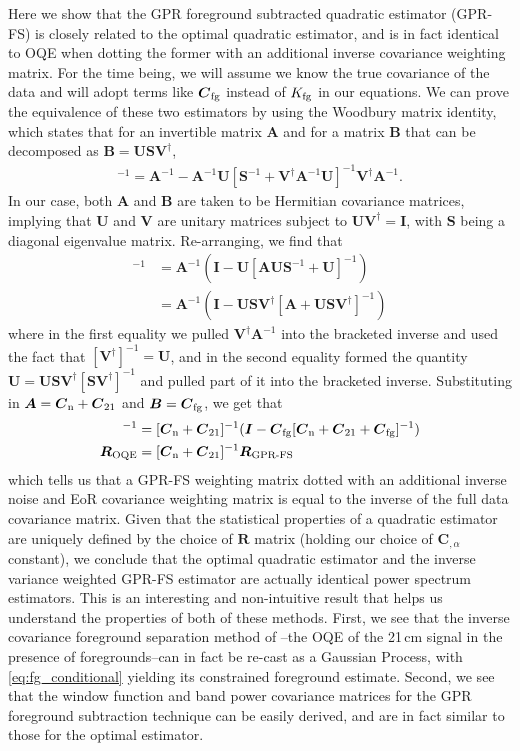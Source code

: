 \documentclass[a4paper,fleqn,usenatbib]{mnras}
\def\R{\boldsymbol{R}}
\def\C{\boldsymbol{C}}
\def\V{\boldsymbol{V}}
\def\Cfg{\boldsymbol{C}_{\rm fg}}
\def\Cto{\boldsymbol{C}_{\rm 21}}
\def\Cn{\boldsymbol{C}_{\rm n}}
\def\I{\boldsymbol{I}}
\def\Kfg{K_{\rm fg}}
\def\A{\boldsymbol{A}}
\def\B{\boldsymbol{B}}
\def\U{\boldsymbol{U}}
\def\S{\boldsymbol{S}}
\def\V{\boldsymbol{V}}
\begin{document}
Here we show that the GPR foreground subtracted quadratic estimator (GPR-FS) is closely related to the optimal quadratic estimator, and is in fact identical to OQE when dotting the former with an additional inverse covariance weighting matrix.
For the time being, we will assume we know the true covariance of the data and will adopt terms like $\Cfg$ instead of $\Kfg$ in our equations.
We can prove the equivalence of these two estimators by using the Woodbury matrix identity, which states that for an invertible matrix $\A$ and for a matrix $\B$ that can be decomposed as $\B = \U\S\V^\dagger$,
\begin{align}
[\A + \U\S\V^\dagger]^{-1} = \A^{-1} - \A^{-1}\U[\S^{-1} + \V^\dagger\A^{-1}\U]^{-1}\V^\dagger\A^{-1}.
\end{align}
In our case, both $\A$ and $\B$ are taken to be Hermitian covariance matrices, implying that $\U$ and $\V$ are unitary matrices subject to $\U\V^\dagger = \I$, with $\S$ being a diagonal eigenvalue matrix.
Re-arranging, we find that
\begin{align}
[\A + \U\S\V^\dagger]^{-1} &= \A^{-1}(\I - \U[\A\U\S^{-1} + \U]^{-1}) \nonumber \\ 
&=\A^{-1}(\I - \U\S\V^\dagger[\A + \U\S\V^\dagger]^{-1})
\end{align}
where in the first equality we pulled $\V^\dagger\A^{-1}$ into the bracketed inverse and used the fact that $[\V^\dagger]^{-1} = \U$, and in the second equality formed the quantity $\U = \U\S\V^\dagger[\S\V^\dagger]^{-1}$ and pulled part of it into the bracketed inverse.
Substituting in $\A = \Cn + \Cto$ and $\B = \Cfg$, we get that
\begin{align}
[\Cn + \Cto + \Cfg]^{-1} &= [\Cn + \Cto]^{-1}(\I - \Cfg[\Cn + \Cto +  \Cfg]^{-1}) \nonumber \\
\R_{\rm OQE} &= [\Cn + \Cto]^{-1}\R_{\operatorname{GPR-FS}}
\end{align}
which tells us that a GPR-FS weighting matrix dotted with an additional inverse noise and EoR covariance weighting matrix is equal to the inverse of the full data covariance matrix.
Given that the statistical properties of a quadratic estimator are uniquely defined by the choice of $\R$ matrix (holding our choice of $\C_{,\alpha}$ constant), we conclude that the optimal quadratic estimator and the inverse variance weighted GPR-FS estimator are actually identical power spectrum estimators.
This is an interesting and non-intuitive result that helps us understand the properties of both of these methods.
First, we see that the inverse covariance foreground separation method of \citet{Liu2011}--the OQE of the 21\,cm signal in the presence of foregrounds--can in fact be re-cast as a Gaussian Process, with \autoref{eq:fg_conditional} yielding its constrained foreground estimate.
Second, we see that the window function and band power covariance matrices for the GPR foreground subtraction technique can be easily derived, and are in fact similar to those for the optimal estimator.
\end{document}
